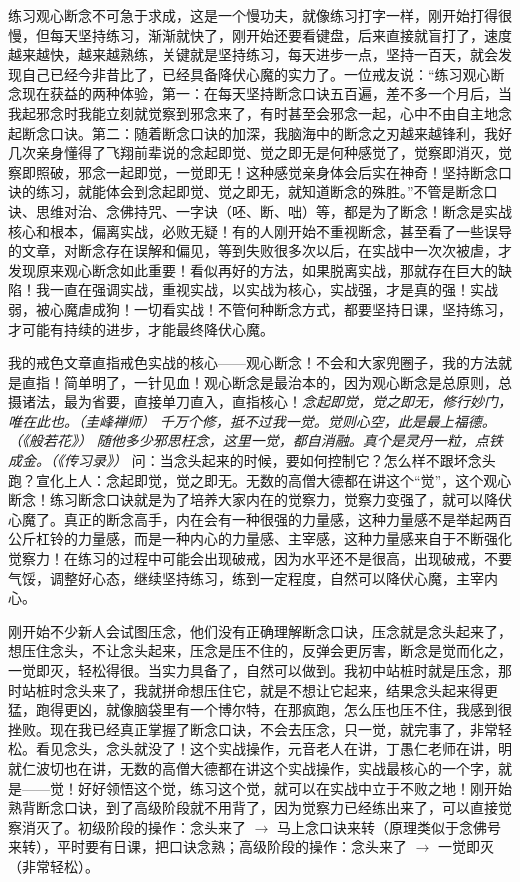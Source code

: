 练习观心断念不可急于求成，这是一个慢功夫，就像练习打字一样，刚开始打得很慢，但每天坚持练习，渐渐就快了，刚开始还要看键盘，后来直接就盲打了，速度越来越快，越来越熟练，关键就是坚持练习，每天进步一点，坚持一百天，就会发现自己已经今非昔比了，已经具备降伏心魔的实力了。一位戒友说：“练习观心断念现在获益的两种体验，第一：在每天坚持断念口诀五百遍，差不多一个月后，当我起邪念时我能立刻就觉察到邪念来了，有时甚至会邪念一起，心中不由自主地念起断念口诀。第二：随着断念口诀的加深，我脑海中的断念之刃越来越锋利，我好几次亲身懂得了飞翔前辈说的念起即觉、觉之即无是何种感觉了，觉察即消灭，觉察即照破，邪念一起即觉，一觉即无！这种感觉亲身体会后实在神奇！坚持断念口诀的练习，就能体会到念起即觉、觉之即无，就知道断念的殊胜。”不管是断念口诀、思维对治、念佛持咒、一字诀（呸、断、咄）等，都是为了断念！断念是实战核心和根本，偏离实战，必败无疑！有的人刚开始不重视断念，甚至看了一些误导的文章，对断念存在误解和偏见，等到失败很多次以后，在实战中一次次被虐，才发现原来观心断念如此重要！看似再好的方法，如果脱离实战，那就存在巨大的缺陷！我一直在强调实战，重视实战，以实战为核心，实战强，才是真的强！实战弱，被心魔虐成狗！一切看实战！不管何种断念方式，都要坚持日课，坚持练习，才可能有持续的进步，才能最终降伏心魔。

我的戒色文章直指戒色实战的核心——观心断念！不会和大家兜圈子，我的方法就是直指！简单明了，一针见血！观心断念是最治本的，因为观心断念是总原则，总摄诸法，最为省要，直接单刀直入，直指核心！\textit{念起即觉，觉之即无，修行妙门，唯在此也。（圭峰禅师）} \textit{千万个修，抵不过我一觉。觉则心空，此是最上福德。（《般若花》）} \textit{随他多少邪思枉念，这里一觉，都自消融。真个是灵丹一粒，点铁成金。（《传习录》）} 问：当念头起来的时候，要如何控制它？怎么样不跟坏念头跑？宣化上人：念起即觉，觉之即无。无数的高僧大德都在讲这个“觉”，这个观心断念！练习断念口诀就是为了培养大家内在的觉察力，觉察力变强了，就可以降伏心魔了。真正的断念高手，内在会有一种很强的力量感，这种力量感不是举起两百公斤杠铃的力量感，而是一种内心的力量感、主宰感，这种力量感来自于不断强化觉察力！在练习的过程中可能会出现破戒，因为水平还不是很高，出现破戒，不要气馁，调整好心态，继续坚持练习，练到一定程度，自然可以降伏心魔，主宰内心。

刚开始不少新人会试图压念，他们没有正确理解断念口诀，压念就是念头起来了，想压住念头，不让念头起来，压念是压不住的，反弹会更厉害，断念是觉而化之，一觉即灭，轻松得很。当实力具备了，自然可以做到。我初中站桩时就是压念，那时站桩时念头来了，我就拼命想压住它，就是不想让它起来，结果念头起来得更猛，跑得更凶，就像脑袋里有一个博尔特，在那疯跑，怎么压也压不住，我感到很挫败。现在我已经真正掌握了断念口诀，不会去压念，只一觉，就完事了，非常轻松。看见念头，念头就没了！这个实战操作，元音老人在讲，丁愚仁老师在讲，明就仁波切也在讲，无数的高僧大德都在讲这个实战操作，实战最核心的一个字，就是——觉！好好领悟这个觉，练习这个觉，就可以在实战中立于不败之地！刚开始熟背断念口诀，到了高级阶段就不用背了，因为觉察力已经练出来了，可以直接觉察消灭了。初级阶段的操作：念头来了 $\to$ 马上念口诀来转（原理类似于念佛号来转），平时要有日课，把口诀念熟；高级阶段的操作：念头来了 $\to$ 一觉即灭（非常轻松）。


